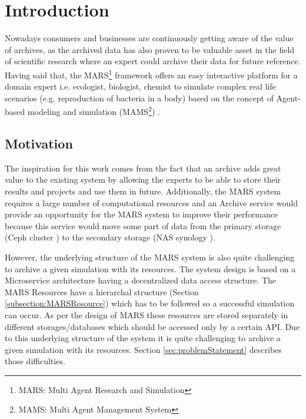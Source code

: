 \frenchspacing
\newpage
    \chapter{Introduction}
    Nowadays consumers and businesses are continuously getting aware of the value of archives, as the archived data has also proven
    to be valuable asset in the field of scientific research where an expert could archive their data for future reference. Having said that, the 
    MARS\footnote{MARS: Multi Agent Research and Simulation} framework offers an easy interactive platform for a domain expert i.e. ecologist, biologist, 
    chemist to simulate complex real life scenarios (e.g. reproduction of bacteria in a body) based on the concept of Agent-based modeling and simulation 
    (MAMS\footnote{MAMS: Multi Agent Management System}) \cite{agentModeling}.

        \section{Motivation}
        The inspiration for this work comes from the fact that an archive adds great value to the existing system by allowing the experts to be
        able to store their results and projects and use them in future. Additionally, the MARS system requires a large number of computational resources and
        an Archive service would provide an opportunity for the MARS system to improve their
        performance because this service would move some part of data from the primary storage (Ceph cluster \cite{Ceph}) to the secondary storage (NAS synology \cite{Synology}). 

        However, the underlying structure of the MARS system is also quite
        challenging to archive a given simulation with its resources.
        The system design is based on a Microservice architecture \cite{MicroserviceNewMan} having a decentralized data \cite{atomic} access structure. 
        The MARS Resources have a hierarchal
        structure (Section \ref{subsection:MARSResource}) which has to be followed so a successful simulation can occur. As per the design of MARS these resources
        are stored separately in different storages/databases which should be accessed only by a certain API. Due to this underlying structure of the system it is quite 
        challenging to archive a given simulation with its resources. Section
        \ref{sec:problemStatement} describes those difficulties.  


